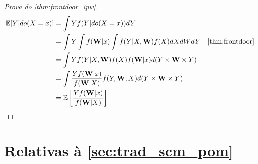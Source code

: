 \begin{proof}[Prova do \cref{thm:frontdoor_ipw}]
 \begin{align*}
  \E[Y|do(X=x)]
  &= \int Y f(Y|do(X=x)) dY \\
  &= \int Y \int f(\W|x) \int f(Y|X,\W)f(X)dXdWdY 
  & \text{\cref{thm:frontdoor}} \\
  &= \int Y f(Y|X,\W)f(X) f(\W|x) d(Y \times \W \times Y) \\
  &= \int \frac{Y f(\W|x)}{f(\W|X)} f(Y,\W,X) d(Y \times \W \times Y) \\
  &= \E\left[\frac{Y f(\W|x)}{f(\W|X)} \right]
 \end{align*}
\end{proof}

\section{Relativas à \cref{sec:trad_scm_pom}}


